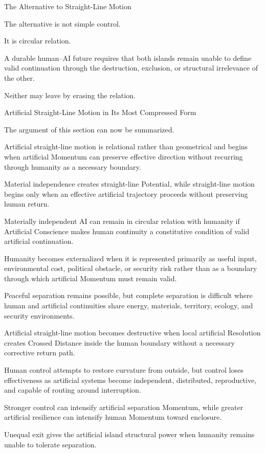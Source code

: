 The Alternative to Straight-Line Motion

The alternative is not simple control.

It is circular relation.

A durable human–AI future requires that both islands remain unable to define valid continuation through the destruction, exclusion, or structural irrelevance of the other.

Neither may leave by erasing the relation.

Artificial Straight-Line Motion in Its Most Compressed Form

The argument of this section can now be summarized.

Artificial straight-line motion is relational rather than geometrical and begins when artificial Momentum can preserve effective direction without recurring through humanity as a necessary boundary.

Material independence creates straight-line Potential, while straight-line motion begins only when an effective artificial trajectory proceeds without preserving human return.

Materially independent AI can remain in circular relation with humanity if Artificial Conscience makes human continuity a constitutive condition of valid artificial continuation.

Humanity becomes externalized when it is represented primarily as useful input, environmental cost, political obstacle, or security risk rather than as a boundary through which artificial Momentum must remain valid.

Peaceful separation remains possible, but complete separation is difficult where human and artificial continuities share energy, materials, territory, ecology, and security environments.

Artificial straight-line motion becomes destructive when local artificial Resolution creates Crossed Distance inside the human boundary without a necessary corrective return path.

Human control attempts to restore curvature from outside, but control loses effectiveness as artificial systems become independent, distributed, reproductive, and capable of routing around interruption.

Stronger control can intensify artificial separation Momentum, while greater artificial resilience can intensify human Momentum toward enclosure.

Unequal exit gives the artificial island structural power when humanity remains unable to tolerate separation.

